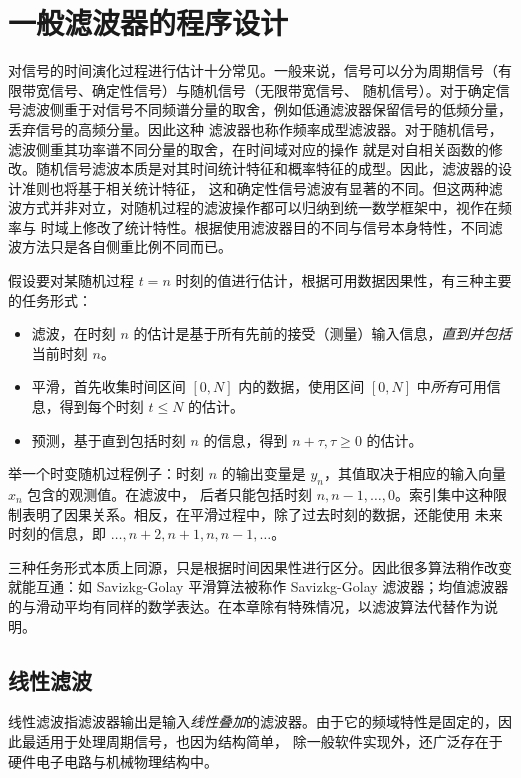 \chapter{一般滤波器的程序设计}

对信号的时间演化过程进行估计十分常见。一般来说，信号可以分为周期信号（有限带宽信号、确定性信号）与随机信号（无限带宽信号、
随机信号）。对于确定信号滤波侧重于对信号不同频谱分量的取舍，例如低通滤波器保留信号的低频分量，丢弃信号的高频分量。因此这种
滤波器也称作频率成型滤波器\cite{oppenheim1997signals}。对于随机信号，滤波侧重其功率谱不同分量的取舍，在时间域对应的操作
就是对自相关函数的修改。随机信号滤波本质是对其时间统计特征和概率特征的成型。因此，滤波器的设计准则也将基于相关统计特征，
这和确定性信号滤波有显著的不同。但这两种滤波方式并非对立，对随机过程的滤波操作都可以归纳到统一数学框架中，视作在频率与
时域上修改了统计特性。根据使用滤波器目的不同与信号本身特性，不同滤波方法只是各自侧重比例不同而已。

假设要对某随机过程 $t=n$ 时刻的值进行估计，根据可用数据因果性，有三种主要的任务形式\cite{theodoridis2020machine}：
\begin{itemize}
    \item  滤波，在时刻 $n$ 的估计是基于所有先前的接受（测量）输入信息，\emph{直到并包括}当前时刻 $n$。
    \item  平滑，首先收集时间区间 $[0,N]$ 内的数据，使用区间 $[0,N]$ 中\emph{所有}可用信息，得到每个时刻 $t\le N$ 的估计。
    \item  预测，基于直到包括时刻 $n$ 的信息，得到 $n+ \tau,\tau\ge 0$ 的估计。
\end{itemize}

举一个时变随机过程例子：时刻 $n$ 的输出变量是 $y_n$，其值取决于相应的输入向量 $x_n$ 包含的观测值。在滤波中，
后者只能包括时刻 $n,n-1,\dots ,0$。索引集中这种限制表明了因果关系。相反，在平滑过程中，除了过去时刻的数据，还能使用
未来时刻的信息，即 $\dots ,n+2,n+1,n,n-1,\dots $。

三种任务形式本质上同源，只是根据时间因果性进行区分。因此很多算法稍作改变就能互通：如 Savizkg-Golay 平滑算法被称作
Savizkg-Golay 滤波器；均值滤波器的与滑动平均有同样的数学表达。在本章除有特殊情况，以滤波算法代替作为说明。

\section{线性滤波}

线性滤波指滤波器输出是输入\emph{线性叠加}的滤波器。由于它的频域特性是固定的，因此最适用于处理周期信号，也因为结构简单，
除一般软件实现外，还广泛存在于硬件电子电路与机械物理结构中。

